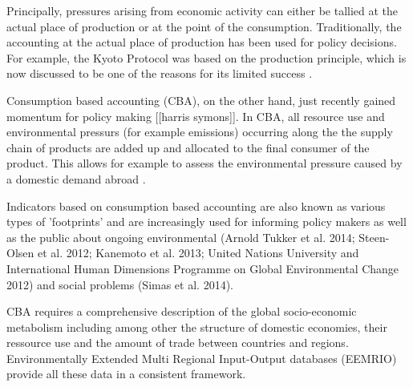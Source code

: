 Principally, pressures arising from economic activity can either be tallied at
the actual place of production or at the point of the consumption.
Traditionally, the accounting at the actual place of production has been used
for policy decisions. For example, the Kyoto Protocol was based on the
production principle, which is now discussed to be one of the reasons for its
limited success \cite{23192129}. 

Consumption based accounting (CBA), on the other hand, just recently gained
momentum for policy making [[harris symons]]. In CBA, all resource use and environmental
pressurs (for example emissions) occurring along the the supply chain of
products are added up and allocated to the final consumer of the product. This
allows for example to assess the environmental pressure caused by a domestic
demand abroad \cite{Weinzettel_2013}\cite{20212122}.

Indicators based on consumption based accounting are also known as various
types of 'footprints' and are increasingly used for informing policy makers as
well as the public about ongoing environmental (Arnold Tukker et al. 2014;
Steen-Olsen et al. 2012; Kanemoto et al. 2013; United Nations University and
International Human Dimensions Programme on Global Environmental Change 2012)
and social problems (Simas et al. 2014). 

CBA requires a comprehensive description of the global socio-economic
metabolism including among other the structure of domestic economies, their
ressource use and the amount of trade between countries and regions.
Environmentally Extended Multi Regional Input-Output databases (EEMRIO) provide
all these data in a consistent framework. 